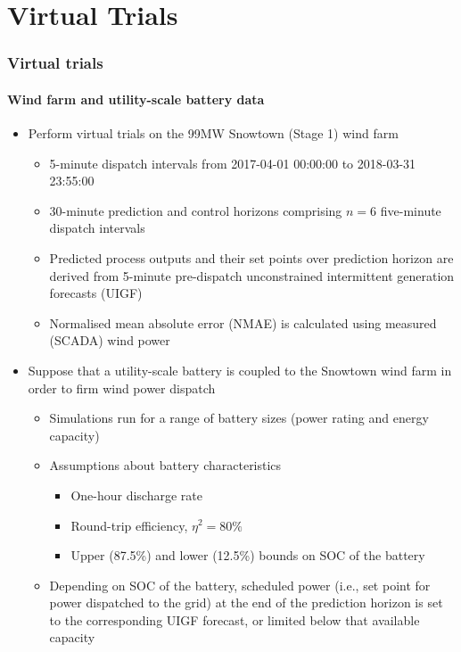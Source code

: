 \documentclass[presentation, smaller, table, svgnames]{beamer}
\begin{document}
\section{Virtual Trials}

\begin{frame}
	\frametitle{Virtual trials}
	\framesubtitle{Wind farm and utility-scale battery data}

	\begin{itemize}
		\item  Perform virtual trials on the 99MW Snowtown (Stage 1) wind farm
		\begin{itemize}
			\item  5-minute dispatch intervals from 2017-04-01 00:00:00 to 2018-03-31 23:55:00
			\item  30-minute prediction and control horizons comprising $n=6$ five-minute dispatch intervals
			\item  Predicted process outputs and their set points over prediction horizon are derived from 5-minute pre-dispatch unconstrained intermittent generation forecasts (UIGF)
			\item  Normalised mean absolute error (NMAE) is calculated using measured (SCADA) wind power
		\end{itemize}
		
		\item  Suppose that a utility-scale battery is coupled to the Snowtown wind farm in order to firm wind power dispatch
		\begin{itemize}
			\item  Simulations run for a range of battery sizes (power rating and energy capacity) 
			\item  Assumptions about battery characteristics
			\begin{itemize}
				\item  One-hour discharge rate
				\item  Round-trip efficiency, $\eta^{2} = 80\%$
				\item  Upper (87.5\%) and lower (12.5\%) bounds on SOC of the battery
			\end{itemize}
			\item  Depending on SOC of the battery, scheduled power (i.e., set point for power dispatched to the grid) at the end of the prediction horizon is set to the corresponding UIGF forecast, or limited below that available capacity
		\end{itemize}
				
	\end{itemize}
	
\end{frame}
\end{document}
